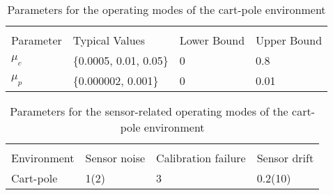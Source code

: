 \documentclass{article}
\begin{document}
\begin{table}[h]
  \caption{Parameters for the operating modes of the cart-pole environment}
  \label{tbl::CartpoleParams}
  \begin{center}
  \begin{tabular}{l|l|l|l|}
      & \multicolumn{3}{c}{} \\
  Parameter & Typical Values & Lower Bound & Upper Bound \\
   \hline
   $\mu_c$ & \{0.0005, 0.01, 0.05\}  & 0 & 0.8 \\
   $\mu_p$ & \{0.000002, 0.001\} & 0 & 0.01 \\
   \hline
  \end{tabular}
  \end{center}
\end{table}

\begin{table}[h]
  \caption{Parameters for the sensor-related operating modes of the cart-pole environment}
  \label{tbl::SensorAnomalCartPole}
  \begin{center}
  \begin{tabular}{l|l|l|l|}
      & \multicolumn{3}{c}{} \\
  Environment & Sensor noise & Calibration failure & Sensor drift \\
   \hline
   Cart-pole & 1(2)& 3 & 0.2(10) \\
   \hline
  \end{tabular}
  \end{center}
\end{table}





\end{document}
